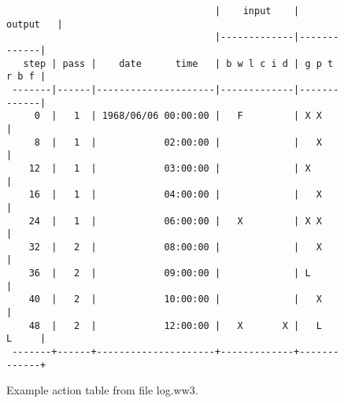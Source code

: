 \begin{figure}
{\small \begin{verbatim}
                                     |    input    |    output   |
                                     |-------------|-------------|
   step | pass |    date      time   | b w l c i d | g p t r b f |
 -------|------|---------------------|-------------|-------------|
     0  |   1  | 1968/06/06 00:00:00 |   F         | X X         |
     8  |   1  |            02:00:00 |             |   X         |
    12  |   1  |            03:00:00 |             | X           |
    16  |   1  |            04:00:00 |             |   X         |
    24  |   1  |            06:00:00 |   X         | X X         |
    32  |   2  |            08:00:00 |             |   X         |
    36  |   2  |            09:00:00 |             | L           |
    40  |   2  |            10:00:00 |             |   X         |
    48  |   2  |            12:00:00 |   X       X |   L   L     |
 -------+------+---------------------+-------------+-------------+ 
\end{verbatim} }
\caption{Example action table from file {\file log.ww3}.} \label{fig:log}
\botline
\end{figure}
